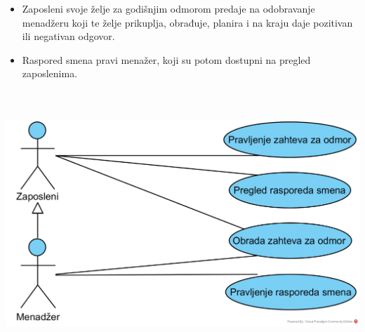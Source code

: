 \documentclass{article}
\begin{document}
\begin{itemize}
\item Zaposleni svoje želje za godišnjim odmorom predaje na odobravanje menadžeru koji te želje prikuplja, obrađuje, planira i na kraju daje pozitivan ili negativan odgovor.
\item Raspored smena pravi menažer, koji su potom dostupni na pregled zaposlenima.
\end{itemize}
\includegraphics[width=\textwidth, height=100mm, keepaspectratio]{SU_4_hr.png}
\end{document}

